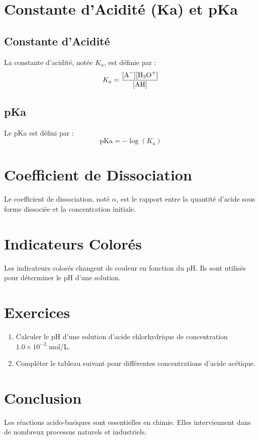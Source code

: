 \documentclass[12pt]{article}
\begin{document}
\section{Constante d'Acidité (Ka) et pKa}
\subsection{Constante d'Acidité}
La constante d'acidité, notée \(K_a\), est définie par :
\[
K_a = \frac{[\ce{A-}][\ce{H3O+}]}{[\ce{AH}]}
\]

\subsection{pKa}
Le pKa est défini par :
\[
\text{pKa} = -\log(K_a)
\]

\section{Coefficient de Dissociation}
Le coefficient de dissociation, noté \(\alpha\), est le rapport entre la quantité d'acide sous forme dissociée et la concentration initiale.

\section{Indicateurs Colorés}
Les indicateurs colorés changent de couleur en fonction du pH. Ils sont utilisés pour déterminer le pH d'une solution.

\section{Exercices}
\begin{enumerate}
\item Calculer le pH d'une solution d'acide chlorhydrique de concentration \(1.0 \times 10^{-2}\) mol/L.
\item Compléter le tableau suivant pour différentes concentrations d'acide acétique.
\end{enumerate}

\section{Conclusion}
Les réactions acido-basiques sont essentielles en chimie. Elles interviennent dans de nombreux processus naturels et industriels.
\end{document}
